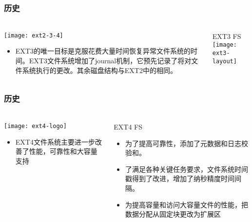 \begin{frame}[fragile]
	\frametitle{历史}
	
	\frametitle{ }
	\begin{columns}[t]
		\begin{column}{.4\textwidth}
			
			\texttt{[image: ext2-3-4]}
			\begin{itemize}
				\item EXT3的唯一目标是克服花费大量时间恢复异常文件系统的时间。EXT3文件系统增加了journal机制，它预先记录了将对文件系统执行的更改。其余磁盘结构与EXT2中的相同。
				
			\end{itemize}
			
		\end{column}
		
		\begin{column}{.5\textwidth}			
			EXT3 FS
			\texttt{[image: ext3-layout]}
			
		\end{column}
	\end{columns}
	
\end{frame}


\begin{frame}[fragile]
	\frametitle{历史}
	
	\frametitle{ }
	\begin{columns}[t]
		\begin{column}{.3\textwidth}
			
			\texttt{[image: ext4-logo]}
			\begin{itemize}
				\item EXT4文件系统主要进一步改善了性能，可靠性和大容量支持
				
			\end{itemize}
			
		\end{column}
		
		\begin{column}{.7\textwidth}			
			EXT4 FS
			\begin{itemize}
				\item 为了提高可靠性，添加了元数据和日志校验和。
				\item 了满足各种关键任务要求，文件系统时间戳得到了改进，增加了纳秒精度时间间隔。
				\item 为提高容量和访问大容量文件的性能，把数据分配从固定块更改为扩展区
			\end{itemize}
			
		\end{column}
	\end{columns}
	
\end{frame}


